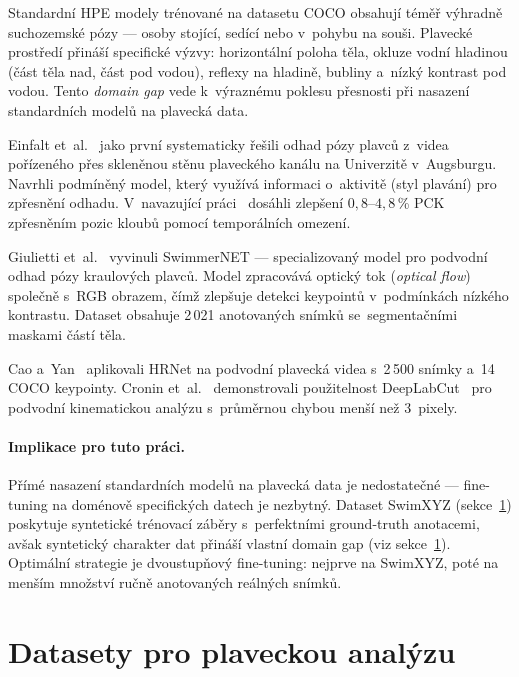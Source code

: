 Standardní HPE modely trénované na datasetu COCO obsahují téměř výhradně suchozemské pózy --- osoby stojící, sedící nebo v~pohybu na souši. Plavecké prostředí přináší specifické výzvy: horizontální poloha těla, okluze vodní hladinou (část těla nad, část pod vodou), reflexy na hladině, bubliny a~nízký kontrast pod vodou. Tento \textit{domain gap} vede k~výraznému poklesu přesnosti při nasazení standardních modelů na plavecká data.

Einfalt et~al.~\cite{einfalt2018} jako první systematicky řešili odhad pózy plavců z~videa pořízeného přes skleněnou stěnu plaveckého kanálu na Univerzitě v~Augsburgu. Navrhli podmíněný model, který využívá informaci o~aktivitě (styl plavání) pro zpřesnění odhadu. V~navazující práci~\cite{einfalt2019} dosáhli zlepšení $0{,}8$--$4{,}8$\,\% PCK zpřesněním pozic kloubů pomocí temporálních omezení.

Giulietti et~al.~\cite{giulietti2023} vyvinuli SwimmerNET --- specializovaný model pro podvodní odhad pózy kraulových plavců. Model zpracovává optický tok (\textit{optical flow}) společně s~RGB obrazem, čímž zlepšuje detekci keypointů v~podmínkách nízkého kontrastu. Dataset obsahuje 2\,021 anotovaných snímků se~segmentačními maskami částí těla.

Cao a~Yan~\cite{cao2024underwater} aplikovali HRNet na podvodní plavecká videa s~2\,500 snímky a~14 COCO keypointy. Cronin et~al.~\cite{cronin2019underwater} demonstrovali použitelnost DeepLabCut~\cite{mathis2018deeplabcut} pro podvodní kinematickou analýzu s~průměrnou chybou menší než 3~pixely.

\paragraph{Implikace pro tuto práci.}
Přímé nasazení standardních modelů na plavecká data je nedostatečné --- fine-tuning na doménově specifických datech je nezbytný. Dataset SwimXYZ (sekce~\ref{sec:datasety}) poskytuje syntetické trénovací záběry s~perfektními ground-truth anotacemi, avšak syntetický charakter dat přináší vlastní domain gap (viz sekce~\ref{sec:datasety}). Optimální strategie je dvoustupňový fine-tuning: nejprve na SwimXYZ, poté na menším množství ručně anotovaných reálných snímků.

\section{Datasety pro plaveckou analýzu}
\label{sec:datasety}


